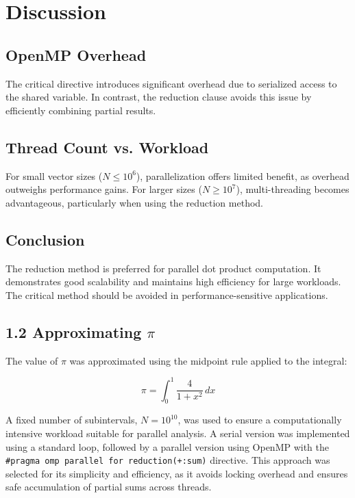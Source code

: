 \documentclass[unicode,11pt,a4paper,oneside,numbers=endperiod,openany]{scrartcl}
\begin{document}
\newpage
\section*{Discussion}

\subsection*{OpenMP Overhead}

The critical directive introduces significant overhead due to serialized access to the shared variable. In contrast, the reduction clause avoids this issue by efficiently combining partial results.

\subsection*{Thread Count vs. Workload}

For small vector sizes ($N \leq 10^6$), parallelization offers limited benefit, as overhead outweighs performance gains. For larger sizes ($N \geq 10^7$), multi-threading becomes advantageous, particularly when using the reduction method.

\subsection*{Conclusion}

The reduction method is preferred for parallel dot product computation. It demonstrates good scalability and maintains high efficiency for large workloads. The critical method should be avoided in performance-sensitive applications.

\subsection*{1.2 Approximating $\pi$}

The value of $\pi$ was approximated using the midpoint rule applied to the integral:

\[
\pi = \int_0^1 \frac{4}{1 + x^2} \, dx
\]

A fixed number of subintervals, $N = 10^{10}$, was used to ensure a computationally intensive workload suitable for parallel analysis. A serial version was implemented using a standard loop, followed by a parallel version using OpenMP with the \texttt{\#pragma omp parallel for reduction(+:sum)} directive. This approach was selected for its simplicity and efficiency, as it avoids locking overhead and ensures safe accumulation of partial sums across threads.
\end{document}
